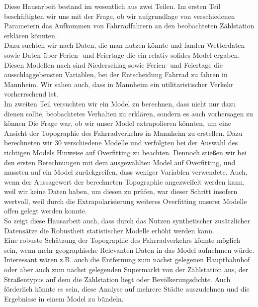 \documentclass[a4paper,12pt]{thesis}
\begin{document}
Diese Hausarbeit bestand im wesentlich aus zwei Teilen. Im ersten Teil beschäftigten wir uns mit der Frage, ob wir aufgrundlage von verschiedenen Parametern das Aufkommen von Fahrradfahrern an den beobachteten Zählstation erklären könnten.\\
Dazu suchten wir nach Daten, die man nutzen könnte und fanden Wetterdaten sowie Daten über Ferien- und Feiertage die ein relativ solides Model ergaben. Diesen Modellen nach sind Niederschlag sowie Ferien- und Feiertage die ausschlaggebensten Variablen, bei der Entscheidung Fahrrad zu fahren in Mannheim. Wir sahen auch, dass in Mannheim ein utilitaristischer Verkehr vorherrschend ist.\\
Im zweiten Teil versuchten wir ein Model zu berechnen, dass nicht nur dazu dienen sollte, beobachtetes Verhalten zu erklären, sondern es auch vorhersagen zu können Die Frage war, ob wir unser Model extrapolieren könnten, um eine Ansicht der Topographie des Fahrradverkehrs in Mannheim zu erstellen. Dazu berechneten wir 30 verschiedene Modelle und verfolgten bei der Auswahl des richtigen Models Hinweise auf Overfitting zu beachten. Dennoch stießen wir bei den ersten Berechnungen mit dem ausgewählten Model auf Overfitting, und mussten auf ein Model zurückgreifen, dass weniger Variablen verwendete. Auch, wenn der Aussagewert der berechneten Topographie angezweifelt werden kann, weil wir keine Daten haben, um diesen zu prüfen, war dieser Schritt insofern wertvoll, weil durch die Extrapolarisierung weiteres Overfitting unserer Modelle offen gelegt werden konnte.\\
So zeigt diese Hausarbeit auch, dass durch das Nutzen synthetischer zusätzlicher Datensätze die Robustheit statistischer Modelle erhöht werden kann.\\
Eine robuste Schätzung der Topographie des Fahrradverkehrs könnte möglich sein, wenn mehr geographische Relevanten Daten in das Model aufnehmen würde. Interessant wären z.B. auch die Entfernung zum nächst gelegenen Hauptbahnhof oder aber auch zum nächst gelegenden Supermarkt von der Zählstation aus, der Straßentypus auf dem die Zählstation liegt oder Bevölkerungsdichte. Auch förderlich könnte es sein, diese Analyse auf mehrere Städte auszudehnen und die Ergebnisse in einem Model zu bündeln.
\end{document}
